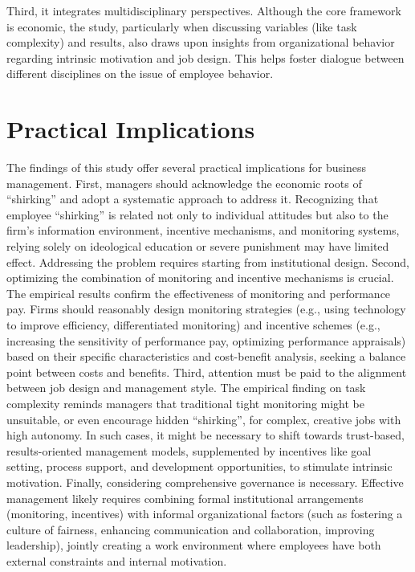 Third, it {integrates multidisciplinary perspectives}. Although the core framework is economic, the study, particularly when discussing variables (like task complexity) and results, also draws upon insights from organizational behavior regarding intrinsic motivation and job design. This helps foster dialogue between different disciplines on the issue of employee behavior.

\section{Practical Implications}

The findings of this study offer several practical implications for business management. First, managers should acknowledge the economic roots of \enquote{shirking} and adopt a systematic approach to address it. Recognizing that employee \enquote{shirking} is related not only to individual attitudes but also to the firm's information environment, incentive mechanisms, and monitoring systems, relying solely on ideological education or severe punishment may have limited effect. Addressing the problem requires starting from institutional design. Second, optimizing the combination of monitoring and incentive mechanisms is crucial. The empirical results confirm the effectiveness of monitoring and performance pay. Firms should reasonably design monitoring strategies (e.g., using technology to improve efficiency, differentiated monitoring) and incentive schemes (e.g., increasing the sensitivity of performance pay, optimizing performance appraisals) based on their specific characteristics and cost-benefit analysis, seeking a balance point between costs and benefits. Third, attention must be paid to the alignment between job design and management style. The empirical finding on task complexity reminds managers that traditional tight monitoring might be unsuitable, or even encourage hidden \enquote{shirking}, for complex, creative jobs with high autonomy. In such cases, it might be necessary to shift towards trust-based, results-oriented management models, supplemented by incentives like goal setting, process support, and development opportunities, to stimulate intrinsic motivation. Finally, considering comprehensive governance is necessary. Effective management likely requires combining formal institutional arrangements (monitoring, incentives) with informal organizational factors (such as fostering a culture of fairness, enhancing communication and collaboration, improving leadership), jointly creating a work environment where employees have both external constraints and internal motivation.

